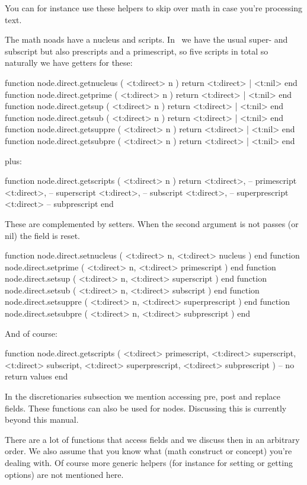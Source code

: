 You can for instance use these helpers to skip over math in case you're
processing text.

The math noads have a nucleus and scripts. In \LUAMETATEX\ we have the usual
super- and subscript but also prescripts and a primescript, so five scripts in
total so naturally we have getters for these:

\starttyping[option=LUA]
function node.direct.getnucleus ( <t:direct> n ) return <t:direct> | <t:nil> end
function node.direct.getprime   ( <t:direct> n ) return <t:direct> | <t:nil> end
function node.direct.getsup     ( <t:direct> n ) return <t:direct> | <t:nil> end
function node.direct.getsub     ( <t:direct> n ) return <t:direct> | <t:nil> end
function node.direct.getsuppre  ( <t:direct> n ) return <t:direct> | <t:nil> end
function node.direct.getsubpre  ( <t:direct> n ) return <t:direct> | <t:nil> end
\stoptyping

plus:

\starttyping[option=LUA]
function node.direct.getscripts ( <t:direct> n )
    return
        <t:direct>, -- primescript
        <t:direct>, -- superscript
        <t:direct>, -- subscript
        <t:direct>, -- superprescript
        <t:direct>  -- subprescript
end
\stoptyping

These are complemented by setters. When the second argument is not passes (or nil)
the field is reset.

\starttyping[option=LUA]
function node.direct.setnucleus ( <t:direct> n, <t:direct> nucleus        ) end
function node.direct.setprime   ( <t:direct> n, <t:direct> primescript    ) end
function node.direct.setsup     ( <t:direct> n, <t:direct> superscript    ) end
function node.direct.setsub     ( <t:direct> n, <t:direct> subscript      ) end
function node.direct.setsuppre  ( <t:direct> n, <t:direct> superprescript ) end
function node.direct.setsubpre  ( <t:direct> n, <t:direct> subprescript   ) end
\stoptyping

And of course:

\starttyping[option=LUA]
function node.direct.getscripts (
    <t:direct> primescript,
    <t:direct> superscript,
    <t:direct> subscript,
    <t:direct> superprescript,
    <t:direct> subprescript
)
    -- no return values
end
\stoptyping

In the discretionaries subsection we mention accessing pre, post and replace
fields. These functions can also be used for  nodes. Discussing
this is currently beyond this manual.

There are a lot of functions that access fields and we discuss then in an
arbitrary order. We also assume that you know what (math construct or concept)
you're dealing with. Of course more generic helpers (for instance for setting or
getting options) are not mentioned here.

